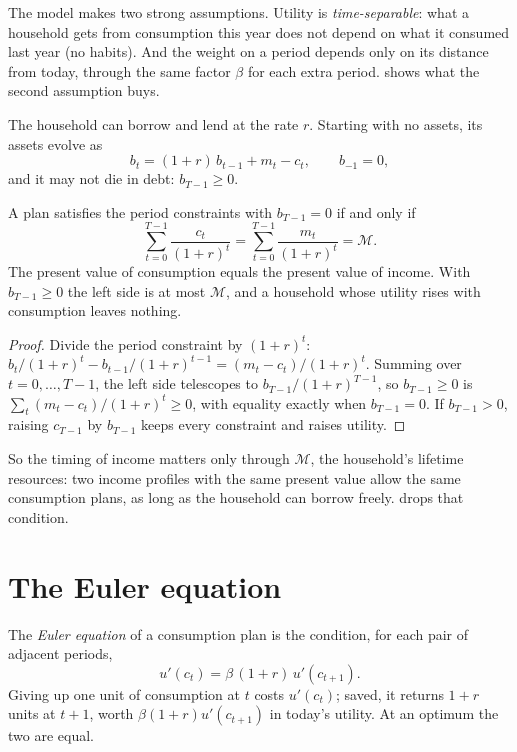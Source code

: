 The model makes two strong assumptions. Utility is \emph{time-separable}: what a household gets from
consumption this year does not depend on what it consumed last year (no habits). And the weight on a
period depends only on its distance from today, through the same factor $\beta$ for each extra period.
 shows what the second assumption buys.

The household can borrow and lend at the rate $r$. Starting with no assets, its assets evolve as
\[
b_t = (1 + r)\, b_{t-1} + m_t - c_t, \qquad b_{-1} = 0,
\]
and it may not die in debt: $b_{T-1} \ge 0$.

\begin{proposition}\label{prop:b2:intertemporal-choice:budget}
A plan satisfies the period constraints with $b_{T-1} = 0$ if and only if
\[
\sum_{t=0}^{T-1} \frac{c_t}{(1 + r)^{t}} = \sum_{t=0}^{T-1} \frac{m_t}{(1 + r)^{t}} = \mathcal{M}.
\]
The present value of consumption equals the present value of income. With $b_{T-1} \ge 0$ the left
side is at most $\mathcal{M}$, and a household whose utility rises with consumption leaves nothing.
\end{proposition}

\begin{proof}
Divide the period constraint by $(1 + r)^{t}$:
$b_t/(1 + r)^{t} - b_{t-1}/(1 + r)^{t-1} = (m_t - c_t)/(1 + r)^{t}$. Summing over $t = 0, \dots, T - 1$,
the left side telescopes to $b_{T-1}/(1 + r)^{T-1}$, so $b_{T-1} \ge 0$ is $\sum_t (m_t - c_t)/(1 +
r)^{t} \ge 0$, with equality exactly when $b_{T-1} = 0$. If $b_{T-1} > 0$, raising $c_{T-1}$ by
$b_{T-1}$ keeps every constraint and raises utility.
\end{proof}

So the timing of income matters only through $\mathcal{M}$, the household's lifetime resources: two
income profiles with the same present value allow the same consumption plans, as long as the household
can borrow freely.  drops that condition.

\section{The Euler equation}\label{sec:b2:intertemporal-choice:euler}

\begin{definition}\label{def:b2:intertemporal-choice:euler-equation}
The \emph{Euler equation} of a consumption plan is the condition, for each pair
of adjacent periods,
\[
u'(c_t) = \beta\,(1 + r)\, u'(c_{t+1}).
\]
Giving up one unit of consumption at $t$ costs $u'(c_t)$; saved, it returns $1 + r$ units at $t + 1$,
worth $\beta(1 + r)u'(c_{t+1})$ in today's utility. At an optimum the two are equal.
\end{definition}

